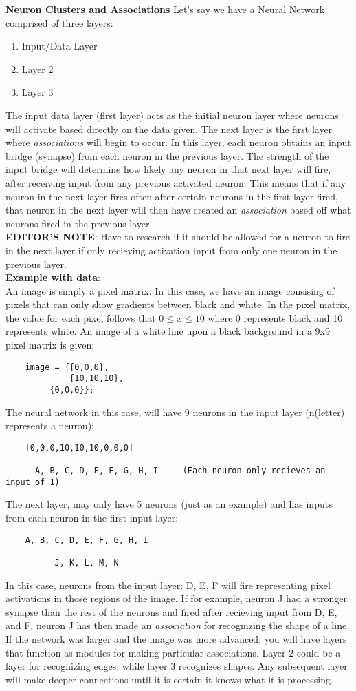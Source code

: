\documentclass{article}
\begin{document}
\textbf{Neuron Clusters and Associations} 
Let's say we have a Neural Network comprised of three layers: 
\begin{enumerate} 
	\item Input/Data Layer 
	\item Layer 2 
	\item Layer 3 
\end{enumerate}
The input data layer (first layer) acts as the initial neuron layer where neurons will activate based directly on the data given. The next layer is the first layer where \textit{associations} will begin to occur. In this layer, each neuron obtains an input bridge (synapse) from each neuron in the previous layer. The strength of the input bridge will determine how likely any neuron in that next layer will fire, after receiving input from any previous activated neuron. This means that if any neuron in the next layer fires often after certain neurons in the first layer fired, that neuron in the next layer will then have created an \textit{association} based off what neurons fired in the previous layer. \\[0.5em]
\textbf{EDITOR'S NOTE}: Have to research if it should be allowed for a neuron to fire in the next layer if only recieving activation input from only one neuron in the previous layer. \\[0.5em] 
\textbf{Example with data}: \\ 
	An image is simply a pixel matrix. In this case, we have an image consising of pixels that can only show gradients between black and white. In the pixel matrix, the value for each pixel follows that \(0 \leq x \leq 10\) where 0 represents black and 10 represents white. An image of a white line upon a black background in a 9x9 pixel matrix is given:\begin{verbatim}
	image = {{0,0,0}, 
	         {10,10,10}, 
		 {0,0,0}}; 
	\end{verbatim}   
 The neural network in this case, will have 9 neurons in the input layer (n(letter) represents a neuron): 
 \begin{verbatim}
 	[0,0,0,10,10,10,0,0,0]

      A, B, C, D, E, F, G, H, I     (Each neuron only recieves an input of 1)
 \end{verbatim}
 The next layer, may only have 5 neurons (just as an example) and has inputs from each neuron in the first input layer: 
 \begin{verbatim}
 	A, B, C, D, E, F, G, H, I 

	      J, K, L, M, N 
 \end{verbatim}
 In this case, neurons from the input layer: D, E, F will fire representing pixel activations in those regions of the image. If for example, neuron J had a stronger synapse than the rest of the neurons and fired after recieving input from D, E, and F, neuron J has then made an \textit{association} for recognizing the shape of a line. \\[0.5em] 
 If the network was larger and the image was more advanced, you will have layers that function as modules for making particular associations. Layer 2 could be a layer for recognizing edges, while layer 3 recognizes shapes. Any subsequent layer will make deeper connections until it is certain it knows what it is processing. 
\end{document}
